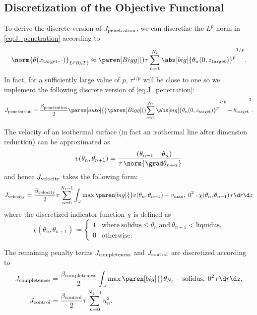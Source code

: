 \subsection{Discretization of the Objective Functional}

To derive the discrete version of $J_\textup{penetration}$, we can discretize the $L^p$-norm in \eqref{eq:J_penetration} according to
\begin{equation*}
	\norm{\theta(x_{\text{target}},\cdot)}_{L^p(0,T)}
	\approx
	\paren[Bigg](){\tau \sum_{n=1}^{N_t} \abs[big]{\theta_n(0,z_\textup{target})}^p}^{1/p}
	.
\end{equation*}
In fact, for a sufficiently large value of $p$, $\tau^{1/p}$ will be close to one so we implement the following discrete version of \eqref{eq:J_penetration}:
\begin{equation} \label{eq:J_penetration_discrete}
	J_\textup{penetration} 
	= 
	\frac{\beta_\textup{penetration}}{2}
	\paren[auto]\{\}{\paren[Bigg](){\sum_{n=1}^{N_t} \abs[big]{\theta_n(0,z_\textup{target})}^p}^{1/p} - \theta_\textup{target}}^2
	.
\end{equation}

The velocity of an isothermal surface (in fact an isothermal line after dimension reduction) can be approximated as
\begin{equation}
	v(\theta_n, \theta_{n+1}) 
	= 
	\frac{{}-{}(\theta_{n+1}-\theta_n)}{\tau \, \norm{\grad \theta_{n+\alpha}}}
\end{equation}
and hence $J_\textup{velocity}$ takes the following form:
\begin{equation}
	J_\textup{velocity} 
	=
	\frac{\beta_\textup{velocity}}{2} \tau \sum_{n=0}^{N_t-1} \int_{\omega} \max \paren[big]\{\}{v(\theta_n, \theta_{n+1}) - v_{\max}, \; 0}^2 \cdot
	\chi(\theta_n, \theta_{n+1})
	\, r \d r \d z
\end{equation}
where the discretized indicator function $\chi$ is defined as
\begin{equation}
	\chi(\theta_n, \theta_{n+1})
	\coloneqq
	\begin{cases}
		1 & \text{where}\ \text{solidus} \le \theta_n\ \text{and}\ \theta_{n+1} < \text{liquidus}
		,
		\\
		0 & \text{otherwise}
		.
	\end{cases}
\end{equation}

The remaining penalty terms $J_\textup{completeness}$ and $J_\textup{control}$ are discretized according to
\begin{align}
	J_\textup{completeness} 
	&
	=
	\frac{\beta_\textup{completeness}}{2} \int_{\omega} \max \paren[big]\{\}{\theta_{N_t} - \text{solidus}, \; 0}^2 \, r \d r \d z
	, 
	\\
	J_\textup{control} 
	&
	=
	\frac{\beta_\textup{control}}{2} \tau \sum_{n=0}^{N_t-1} u_n^2
	.
\end{align}


